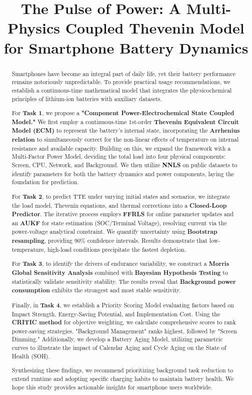 \documentclass{mcmthesis}
\title{The Pulse of Power: A Multi-Physics Coupled Thevenin Model for Smartphone Battery Dynamics}
\begin{document}
\begin{abstract}
\hspace{2em}Smartphones have become an integral part of daily life, yet their battery performance remains notoriously unpredictable. To provide practical usage recommendations, we establish a continuous-time mathematical model that integrates the physicochemical principles of lithium-ion batteries with auxiliary datasets.

For \textbf{Task 1}, we propose a \textbf{"Component Power-Electrochemical State Coupled Model."} We first employ a continuous-time 1st-order \textbf{Thevenin Equivalent Circuit Model (ECM)} to represent the battery's internal state, incorporating the \textbf{Arrhenius relation} to simultaneously correct for the non-linear effects of temperature on internal resistance and available capacity. Building on this, we expand the framework with a Multi-Factor Power Model, deviding the total load into four physical components: Screen, CPU, Network, and Background. We then utilize \textbf{NNLS} on public datasets to identify parameters for both the battery dynamics and power components, laying the foundation for prediction.

For \textbf{Task 2}, to predict TTE under varying initial states and scenarios, we integrate the load model, Thevenin equations, and thermal corrections into a \textbf{Closed-Loop Predictor}. The iterative process employs \textbf{FFRLS} for online parameter updates and an \textbf{AUKF} for state estimation (SOC/Terminal Voltage), resolving current via the power-voltage analytical constraint. We quantify uncertainty using \textbf{Bootstrap resampling}, providing 90\% confidence intervals. Results demonstrate that low-temperature, high-load conditions precipitate the fastest depletion.

For \textbf{Task 3}, to identify the drivers of endurance variability, we construct a \textbf{Morris Global Sensitivity Analysis} combined with \textbf{Bayesian Hypothesis Testing} to statistically validate sensitivity stability. The results reveal that \textbf{Background power consumption} exhibits the strongest and most stable sensitivity.

Finally, in \textbf{Task 4}, we establish a Priority Scoring Model evaluating factors based on Impact Strength, Energy-Saving Potential, and Implementation Cost. Using the \textbf{CRITIC method} for objective weighting, we calculate comprehensive scores to rank power-saving strategies. "Background Management" ranks highest, followed by "Screen Dimming." Additionally, we develop a Battery Aging Model, utilizing parametric curves to illustrate the impact of Calendar Aging and Cycle Aging on the State of Health (SOH).

Synthesizing these findings, we recommend prioritizing background task reduction to extend runtime and adopting specific charging habits to maintain battery health. We hope this study provides actionable insights for smartphone users worldwide.

\end{abstract}
\end{document}
